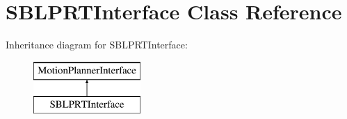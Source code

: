 \section{S\+B\+L\+P\+R\+T\+Interface Class Reference}
\label{classSBLPRTInterface}
Inheritance diagram for S\+B\+L\+P\+R\+T\+Interface\+:\begin{figure}[H]
\begin{center}
\leavevmode
\includegraphics[height=2.000000cm]{classSBLPRTInterface}
\end{center}
\end{figure}

